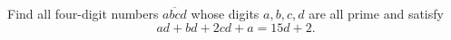 Find all four-digit numbers $\overline{abcd}$ whose digits $a,b,c,d$ are all prime and satisfy
\[
ad+bd+2cd+a=15d+2 .
\]
